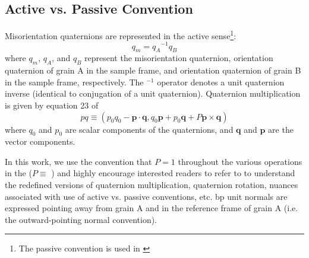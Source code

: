 \documentclass[final,twocolumn,12pt]{elsarticle}
\begin{document}
% 

\begin{appendices}


\section{Active vs. Passive Convention}
\label{sec:app:convention}
Misorientation quaternions are represented in the active sense\footnote{The passive convention is used in \cite{francisGeodesicOctonionMetric2019}}:
\begin{equation}
    q_m = {q_A}^{-1}q_B
\end{equation}
where $q_m$, $q_A$, and $q_B$ represent the misorientation quaternion, orientation quaternion of grain A in the sample frame, and orientation quaternion of grain B in the sample frame, respectively. The $^{-1}$ operator denotes a unit quaternion inverse (identical to conjugation of a unit quaternion). Quaternion multiplication is given by equation 23 of \cite{rowenhorstConsistentRepresentationsConversions2015}
\begin{equation}
p q \equiv\left(p_{0} q_{0}-\mathbf{p} \cdot \mathbf{q}, q_{0} \mathbf{p}+p_{0} \mathbf{q}+P \mathbf{p} \times \mathbf{q}\right)
\end{equation}
where $q_0$ and $p_0$ are scalar components of the quaternions, and $\mathbf{q}$ and $\mathbf{p}$ are the vector components.

In this work, we use the convention that $P=1$ throughout the various operations in the \vfzorepo{} ($P \equiv $ ) and highly encourage interested readers to refer to \citet{rowenhorstConsistentRepresentationsConversions2015} to understand the redefined versions of quaternion multiplication, quaternion rotation, nuances associated with use of active vs. passive conventions, etc. \Gls{bp} unit normals are expressed pointing away from grain A and in the reference frame of grain A (i.e. the outward-pointing normal convention).




\end{appendices}
\end{document}
